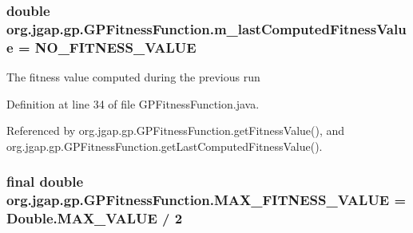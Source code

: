 \hypertarget{classorg_1_1jgap_1_1gp_1_1_g_p_fitness_function_a54c8de1552f152db9565ea5ec43a625e}{
\subsubsection[{m\-\_\-last\-Computed\-Fitness\-Value}]{\setlength{\rightskip}{0pt plus 5cm}double org.\-jgap.\-gp.\-G\-P\-Fitness\-Function.\-m\-\_\-last\-Computed\-Fitness\-Value = {\bf N\-O\-\_\-\-F\-I\-T\-N\-E\-S\-S\-\_\-\-V\-A\-L\-U\-E}\hspace{0.3cm}{\ttfamily [private]}}}\label{classorg_1_1jgap_1_1gp_1_1_g_p_fitness_function_a54c8de1552f152db9565ea5ec43a625e}
The fitness value computed during the previous run 

Definition at line 34 of file G\-P\-Fitness\-Function.\-java.



Referenced by org.\-jgap.\-gp.\-G\-P\-Fitness\-Function.\-get\-Fitness\-Value(), and org.\-jgap.\-gp.\-G\-P\-Fitness\-Function.\-get\-Last\-Computed\-Fitness\-Value().

\hypertarget{classorg_1_1jgap_1_1gp_1_1_g_p_fitness_function_a19cb0f67653683bec271ae48fcd9cfb6}{
\subsubsection[{M\-A\-X\-\_\-\-F\-I\-T\-N\-E\-S\-S\-\_\-\-V\-A\-L\-U\-E}]{\setlength{\rightskip}{0pt plus 5cm}final double org.\-jgap.\-gp.\-G\-P\-Fitness\-Function.\-M\-A\-X\-\_\-\-F\-I\-T\-N\-E\-S\-S\-\_\-\-V\-A\-L\-U\-E = Double.\-M\-A\-X\-\_\-\-V\-A\-L\-U\-E / 2\hspace{0.3cm}{\ttfamily [static]}}}\label{classorg_1_1jgap_1_1gp_1_1_g_p_fitness_function_a19cb0f67653683bec271ae48fcd9cfb6}


